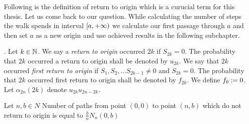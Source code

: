 \begin{rem}
  Following is the definition of return to origin which is a curucial term for this thesis.
  Let us come back to our question.
  While calculating the number of steps the walk spends in interval $[a,{+\infty})$ we calculate our first passage through $a$ and then set $a$ as a new origin and use achieved results in the following subchapter.
\end{rem}

\begin{defn}\label{defn-return_origin}
 \Lrw. Let $k \in \mathbb{N}$. We say a \emph{return to origin} occurred \intime $2k$ if $S_{2k}=0$. The probability that \intime $2k$ occurred a return to origin shall be denoted by $u_{2k}$.
 We say that \intime $2k$ occurred \emph{first return to origin} if $S_1, S_2, \ldots S_{2k-1}\neq 0$ and $S_{2k}=0$.
 The probability that \intime $2k$ occurred first return to origin shall be denoted by $f_{2k}$. We define $f_0 := 0$.
 Let $\alpha_{2n} \left( 2k \right) $ denote $u_{2k}u_{2n-2k}.$
\end{defn}
\begin{thm}\label{thm-ballot_theorem}
 Let $n,b \in N$
 Number of paths from point $ \left( 0,0 \right) $ to point $ \left( n,b \right) $ which do not return to origin is equal to $\frac{b}{n}N_n \left( 0,b \right) $
\end{thm}

